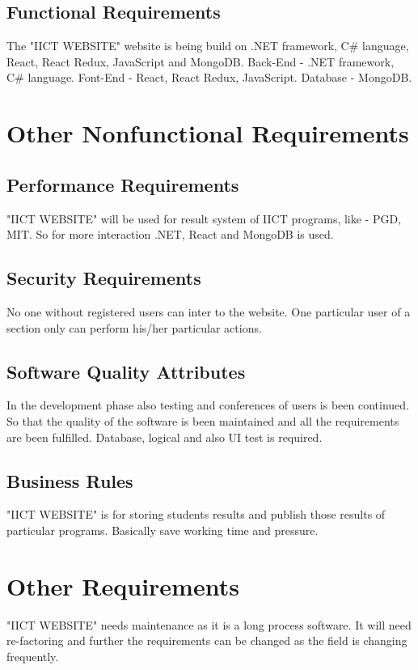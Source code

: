 \documentclass{article}
\begin{document}
\section{Functional Requirements}
The "IICT WEBSITE" website is being build on .NET framework, C\# language, React, React Redux, JavaScript and MongoDB.
\newline
Back-End - .NET framework, C\# language.
\newline
Font-End - React, React Redux, JavaScript.
\newline
Database -  MongoDB.


\chapter{Other Nonfunctional Requirements}

\section{Performance Requirements}
"IICT WEBSITE" will be used for result system of IICT programs, like - PGD, MIT. So for more interaction .NET, React and MongoDB is used. 

\section{Security Requirements}
No one without registered users can inter to the website. One particular user of a section only can perform his/her particular actions. 

\section{Software Quality Attributes}
In the development phase also testing and conferences of users is been continued. So that the quality of the software is been maintained and all the requirements are been fulfilled.
\newline
Database, logical and also UI test is required. 

\section{Business Rules}
"IICT WEBSITE" is for storing students results and publish those results of particular programs.
\newline
Basically save working time and pressure. 


\chapter{Other Requirements}
"IICT WEBSITE" needs maintenance as it is a long process software. It will need re-factoring and further the requirements can be changed as the field is changing frequently.
\end{document}
